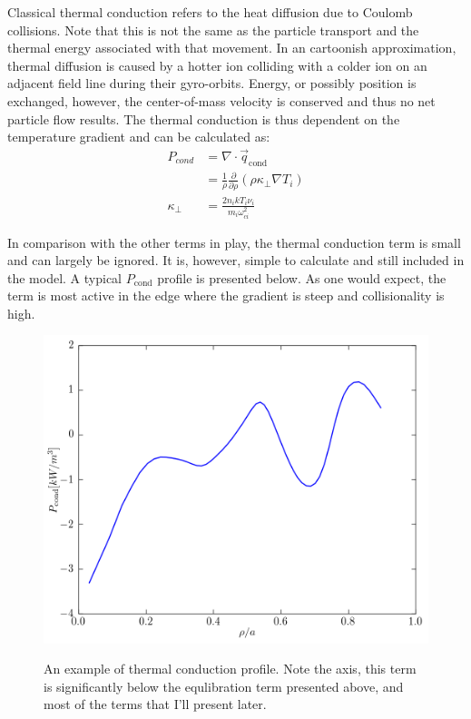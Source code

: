 \begin{refsection}
Classical thermal conduction refers to the heat diffusion due to Coulomb collisions. Note that this is not the same as the particle transport and the thermal energy associated with that movement. In an cartoonish approximation, thermal diffusion is caused by a hotter ion colliding with a colder ion on an adjacent field line during their gyro-orbits. Energy, or possibly position is exchanged, however, the center-of-mass velocity is conserved and thus no net particle flow results. The thermal conduction is thus dependent on the temperature gradient and can be calculated as\cite{Braginskii1965}:
\begin{align}
    P_{cond} &= \nabla\cdot\vec{q}_{\text{cond}} \\
    &= \frac{1}{\rho}\frac{\partial}{\partial\rho}(\rho\kappa_{\perp}\nabla T_{i})\\
    \kappa_{\perp} &= \frac{2n_ikT_i\nu_i}{m_i\omega_{ci}^2}
\end{align}

In comparison with the other terms in play, the thermal conduction term is small and can largely be ignored. It is, however, simple to calculate and still included in the model. A typical $P_{\text{cond}}$ profile is presented below. As one would expect, the term is most active in the edge where the gradient is steep and collisionality is high.

\begin{figure}[!htb]
	\centering
	\includegraphics[width = 0.75\linewidth]{./transport_modeling/p_cond.png}
    \label{fig:P_eq}
    \caption[Thermal conduction profile]{An example of thermal conduction profile. Note the axis, this term is significantly below the equlibration term presented above, and most of the terms that I'll present later.}
    \label{fig:p_cond}
\end{figure}%


\end{refsection}

